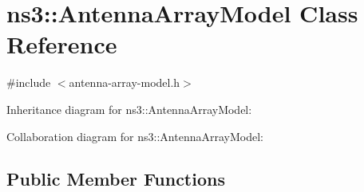 \hypertarget{classns3_1_1AntennaArrayModel}{}\section{ns3\+:\+:Antenna\+Array\+Model Class Reference}
\label{classns3_1_1AntennaArrayModel}


{\ttfamily \#include $<$antenna-\/array-\/model.\+h$>$}



Inheritance diagram for ns3\+:\+:Antenna\+Array\+Model\+:


Collaboration diagram for ns3\+:\+:Antenna\+Array\+Model\+:
\subsection*{Public Member Functions}
